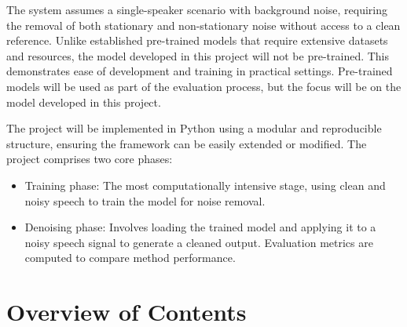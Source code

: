 The system assumes a single-speaker scenario with background noise, requiring the removal of both stationary and non-stationary noise without access to a clean reference. Unlike established pre-trained models that require extensive datasets and resources, the model developed in this project will not be pre-trained. This demonstrates ease of development and training in practical settings. Pre-trained models will be used as part of the evaluation process, but the focus will be on the model developed in this project.

The project will be implemented in Python using a modular and reproducible structure, ensuring the framework can be easily extended or modified. The project comprises two core phases:

\begin{itemize}
    \item Training phase: The most computationally intensive stage, using clean and noisy speech to train the model for noise removal.
    \item Denoising phase: Involves loading the trained model and applying it to a noisy speech signal to generate a cleaned output. Evaluation metrics are computed to compare method performance.
\end{itemize}

\section{Overview of Contents}

